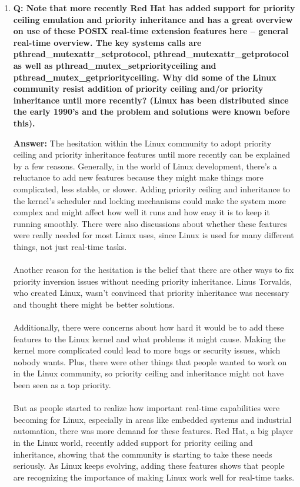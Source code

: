 \documentclass[a4paper,11pt]{article}%
\newenvironment{qanda}{\setlength{\parindent}{0pt}}{\bigskip}
\newcommand{\Q}{\bigskip\bfseries Q: }
\newcommand{\A}{\par\textbf{Answer: } \normalfont}
\begin{document}
\begin{qanda}
\begin{enumerate}
\begin{enumerate}
				\item \Q Note that more recently Red Hat has added support for priority ceiling emulation and
				      priority inheritance and has a great overview on use of these POSIX real-time extension
				      features here – general real-time overview. The key systems calls are\\
				      pthread\_mutexattr\_setprotocol, pthread\_mutexattr\_getprotocol as well as
				      pthread\_mutex\_setpriorityceiling and pthread\_mutex\_getpriorityceiling. Why did some
				      of the Linux community resist addition of priority ceiling and/or priority inheritance until
				      more recently? (Linux has been distributed since the early 1990’s and the problem and solutions were known before this).
				      \A The hesitation within the Linux community to adopt priority ceiling and priority inheritance features until more recently can be explained by a few reasons. Generally, in the world of Linux development, there's a reluctance to add new features because they might make things more complicated, less stable, or slower. Adding priority ceiling and inheritance to the kernel's scheduler and locking mechanisms could make the system more complex and might affect how well it runs and how easy it is to keep it running smoothly. There were also discussions about whether these features were really needed for most Linux uses, since Linux is used for many different things, not just real-time tasks.\\\\
				      Another reason for the hesitation is the belief that there are other ways to fix priority inversion issues without needing priority inheritance. Linus Torvalds, who created Linux, wasn't convinced that priority inheritance was necessary and thought there might be better solutions.\\\\
				      Additionally, there were concerns about how hard it would be to add these features to the Linux kernel and what problems it might cause. Making the kernel more complicated could lead to more bugs or security issues, which nobody wants.
				      Plus, there were other things that people wanted to work on in the Linux community, so priority ceiling and inheritance might not have been seen as a top priority.\\\\
				      But as people started to realize how important real-time capabilities were becoming for Linux, especially in areas like embedded systems and industrial automation, there was more demand for these features. Red Hat, a big player in the Linux world, recently added support for priority ceiling and inheritance, showing that the community is starting to take these needs seriously. As Linux keeps evolving, adding these features shows that people are recognizing the importance of making Linux work well for real-time tasks.



\end{enumerate}
\end{enumerate}
\end{qanda}
\end{document}
